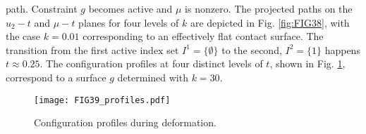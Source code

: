 path. Constraint $g$ becomes active and $\mu$ is nonzero. The projected paths
on the $u_2-t$ and $\mu-t$ planes for four levels of $k$ are
depicted in Fig. \ref{fig:FIG38}, with the case $k=0.01$ corresponding to an 
effectively
flat contact surface. The transition from the first active index set
$I^1=\{\emptyset\}$ to the second, $I^2=\{1\}$ happens $t\approx 0.25$.
The configuration profiles at four distinct levels of $t$, shown in
Fig. \ref{fig:FIG39_Profiles}, correspond to a surface $g$ determined with 
$k=30$.
\begin{figure*}[t]
	\centering
	\qquad
	\caption{Projection of path \textbf{(a)} on $u_2-t$ plane and
		\textbf{(b)} $\mu-t$ plane.}%
	\label{fig:FIG38}%
\end{figure*}
\begin{figure}[b!]
	\centering
	\texttt{[image: FIG39\_profiles.pdf]}
	\caption{Configuration profiles during deformation.}
	\label{fig:FIG39_Profiles}
\end{figure}

